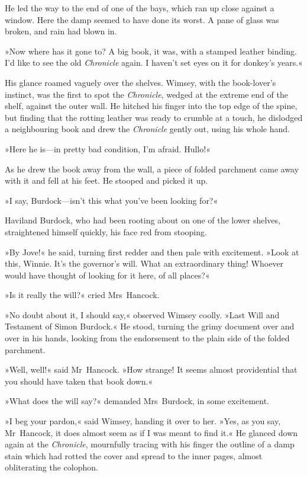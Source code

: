 He led the way to the end of one of the bays, which ran up close against a window. Here the damp seemed to have done its worst. A pane of glass was broken, and rain had blown in.

»Now where has it gone to? A big book, it was, with a stamped leather binding. I'd like to see the old \textit{\textit{Chronicle}} again. I haven't set eyes on it for donkey's years.«

His glance roamed vaguely over the shelves. Wimsey, with the book-lover's instinct, was the first to spot the \textit{\textit{Chronicle}}, wedged at the extreme end of the shelf, against the outer wall. He hitched his finger into the top edge of the spine, but finding that the rotting leather was ready to crumble at a touch, he dislodged a neighbouring book and drew the \textit{\textit{Chronicle}} gently out, using his whole hand.

»Here he is—in pretty bad condition, I'm afraid. Hullo!«

As he drew the book away from the wall, a piece of folded parchment came away with it and fell at his feet. He stooped and picked it up.

»I say, Burdock—isn't this what you've been looking for?«

Haviland Burdock, who had been rooting about on one of the lower shelves, straightened himself quickly, his face red from stooping.

»By Jove!« he said, turning first redder and then pale with excitement. »Look at this, Winnie. It's the governor's will. What an extraordinary thing! Whoever would have thought of looking for it here, of all places?«

»Is it really the will?« cried Mrs~Hancock.

»No doubt about it, I should say,« observed Wimsey coolly. »Last Will and Testament of Simon Burdock.« He stood, turning the grimy document over and over in his hands, looking from the endorsement to the plain side of the folded parchment.

»Well, well!« said Mr~Hancock. »How strange! It seems almost providential that you should have taken that book down.«

»What does the will say?« demanded Mrs~Burdock, in some excitement.

»I beg your pardon,« said Wimsey, handing it over to her. »Yes, as you say, Mr~Hancock, it does almost seem as if I was meant to find it.« He glanced down again at the \textit{Chronicle}, mournfully tracing with his finger the outline of a damp stain which had rotted the cover and spread to the inner pages, almost obliterating the colophon.

